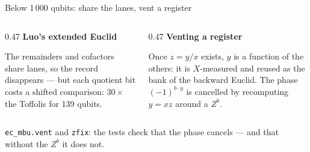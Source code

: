 \documentclass[aspectratio=169,11pt]{beamer}
\newcommand{\blocktitle}[1]{{\bfseries #1}\par\vskip1mm}
\begin{document}
\setcounter{framenumber}{188}
\begin{frame}{Below 1\,000 qubits: share the lanes, vent a register}
  \begin{columns}[T]
    \begin{column}{0.47\textwidth}
      \blocktitle{Luo's extended Euclid}
      The remainders and cofactors share lanes, so the record disappears --- but each quotient bit costs a shifted comparison: $30\times$ the Toffolis for 139 qubits.
    \end{column}
    \begin{column}{0.47\textwidth}
      \blocktitle{Venting a register}
      Once $z=y/x$ exists, $y$ is a function of the others: it is $X$-measured and reused as the bank of the backward Euclid. The phase $(-1)^{b\cdot y}$ is cancelled by recomputing $y=xz$ around a $Z^b$.
    \end{column}
  \end{columns}
  \begin{takeaway}\texttt{ec\_mbu.vent} and \texttt{zfix}: the tests check that the phase cancels --- and that without the $Z^b$ it does not.\end{takeaway}
\end{frame}
\end{document}
